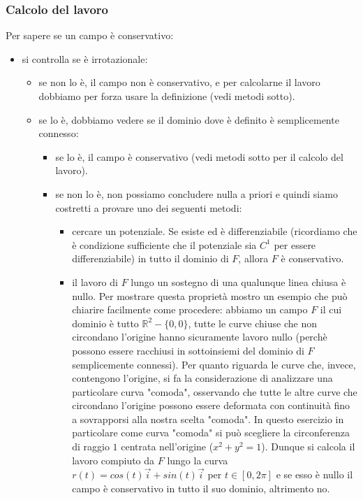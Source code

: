 \subsubsection{Calcolo del lavoro}
Per sapere se un campo è conservativo:
\begin{itemize}
    \item si controlla se è irrotazionale:
    \begin{itemize}
        \item se non lo è, il campo non è conservativo, e per calcolarne il lavoro dobbiamo per forza usare la definizione (vedi metodi sotto).
        \item se lo è, dobbiamo vedere se il dominio dove è definito è semplicemente connesso:
        \begin{itemize}
            \item se lo è, il campo è conservativo (vedi metodi sotto per il calcolo del lavoro).
            \item se non lo è, non possiamo concludere nulla a priori e quindi siamo costretti a provare uno dei seguenti metodi:
            \begin{itemize}
                \item cercare un potenziale. Se esiste ed è differenziabile (ricordiamo che è condizione sufficiente che il potenziale sia $C^1$ per essere differenziabile) in tutto il dominio di $F$, allora $F$ è conservativo.
                \item il lavoro di $F$ lungo un sostegno di una qualunque linea chiusa è nullo. Per mostrare questa proprietà mostro un esempio che può chiarire facilmente come procedere: abbiamo un campo $F$ il cui dominio è tutto $\mathbb{R}^2 - \{0,0\}$, tutte le curve chiuse che non circondano l'origine hanno sicuramente lavoro nullo (perchè possono essere racchiusi in sottoinsiemi del dominio di $F$ semplicemente connessi). Per quanto riguarda le curve che, invece, contengono l'origine, si fa la considerazione di analizzare una particolare curva "comoda", osservando che tutte le altre curve che circondano l'origine possono essere deformata con continuità fino a sovrapporsi alla nostra scelta "comoda". In questo esercizio in particolare come curva "comoda" si può scegliere la circonferenza di raggio $1$ centrata nell'origine ($x^2 + y^2=1$). Dunque si calcola il lavoro compiuto da $F$ lungo la curva $r(t) = cos(t) \vec{i} + sin(t) \vec{i}$ per $t \in[0,2\pi]$ e se esso è nullo il campo è conservativo in tutto il suo dominio, altrimento no. 
            \end{itemize}
        \end{itemize}
    \end{itemize}
\end{itemize}
